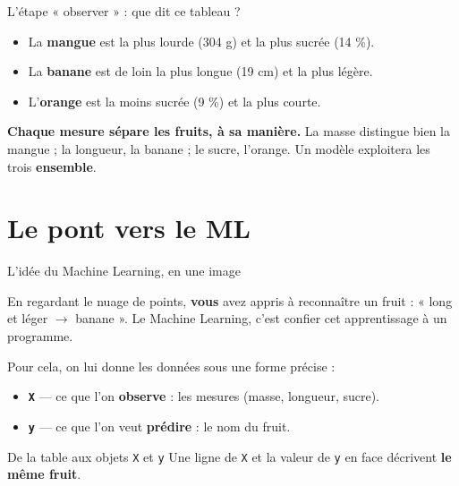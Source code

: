 \documentclass[aspectratio=169,11pt]{beamer}
\begin{document}
\begin{frame}{L'étape « observer » : que dit ce tableau ?}
\begin{itemize}\small
  \item La \textbf{mangue} est la plus lourde (304 g) et la plus sucrée (14 \%).
  \item La \textbf{banane} est de loin la plus longue (19 cm) et la plus légère.
  \item L'\textbf{orange} est la moins sucrée (9 \%) et la plus courte.
\end{itemize}
\begin{ucadret}
{\small \textbf{Chaque mesure sépare les fruits, à sa manière.} La masse distingue bien la mangue ; la longueur, la banane ; le sucre, l'orange. Un modèle exploitera les trois \textbf{ensemble}.}
\end{ucadret}
\end{frame}

\section{Le pont vers le ML}

\begin{frame}{L'idée du Machine Learning, en une image}
\begin{ucadfront}
{\small En regardant le nuage de points, \textbf{vous} avez appris à reconnaître un fruit : « long et léger $\rightarrow$ banane ». Le Machine Learning, c'est confier cet apprentissage à un programme.}
\end{ucadfront}
{\small Pour cela, on lui donne les données sous une forme précise :}
\begin{itemize}\small
  \item \textbf{\texttt{X}} — ce que l'on \textbf{observe} : les mesures (masse, longueur, sucre).
  \item \textbf{\texttt{y}} — ce que l'on veut \textbf{prédire} : le nom du fruit.
\end{itemize}
\end{frame}

\begin{frame}{De la table aux objets \texttt{X} et \texttt{y}}
\vspace{-3pt}
{\small Une ligne de \texttt{X} et la valeur de \texttt{y} en face décrivent \textbf{le même fruit}.}
\end{frame}
\end{document}
